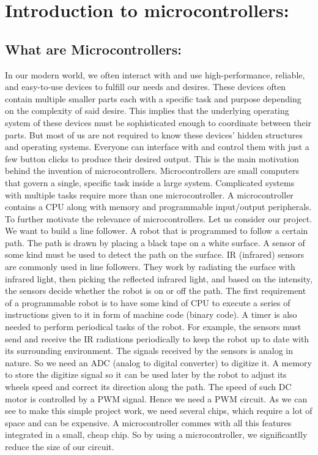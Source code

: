 \documentclass[12pt]{article}
\begin{document}
\section{Introduction to microcontrollers:}
\subsection{What are Microcontrollers:}
In our modern world, we often interact with and use high-performance, reliable, and easy-to-use devices to fulfill our needs and desires.
These devices often contain multiple smaller parts each with a specific task and purpose depending on the complexity of said desire.
This implies that the underlying operating system of these devices must be sophisticated enough to coordinate between their parts.
But most of us are not required to know these devices' hidden structures and operating systems.
Everyone can interface with and control them with just a few button clicks to produce their desired output. This is the main motivation behind the invention of microcontrollers.
Microcontrollers are small computers that govern a single, specific task inside a large system. Complicated systems with multiple tasks require more than one microcontroller.
A microcontroller contains a CPU along with memory and programmable input/output peripherals.
To further motivate the relevance of microcontrollers. Let us consider our project. We want to build a line follower. A robot that is programmed to follow a certain path.
The path is drawn by placing a black tape on a white surface. A sensor of some kind must be used to detect the path on the surface. IR (infrared) sensors are commonly used in line followers.
They work by radiating the surface with infrared light, then picking the reflected infrared light, and based on the intensity, the sensors decide whether the robot is on or off the path. The first requirement of a programmable robot is to have some kind of CPU to execute a series of instructions
given to it in form of machine code (binary code). A timer is also needed to perform periodical tasks of the robot. For example, the sensors must send and receive the IR radiations periodically to keep the robot up to date with its surrounding environment.
The signals received by the sensors is analog in nature. So we need an ADC (analog to digital converter) to digitize it. A memory to store the digitize signal so it can be used later by the robot to adjust its wheels speed and correct its direction along the path.
The speed of such DC motor is controlled by a PWM signal. Hence we need a PWM circuit.
As we can see to make this simple project work, we need several chips, which require a lot of space and can be expensive. A microcontroller commes with all this features integrated in a small, cheap chip.
So by using a microcontroller, we significantlly reduce the size of our circuit.
\end{document}
